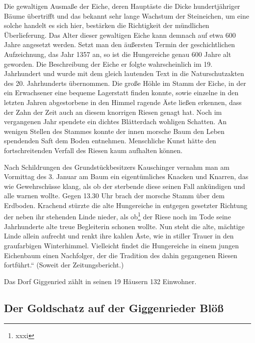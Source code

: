 \documentclass{book}
\begin{document}
Die gewaltigen Ausmaße der Eiche, deren Hauptäste die Dicke
hundertjähriger Bäume übertrifft und das bekannt sehr lange Wachstum der
Steineichen, um eine solche handelt es sich hier, bestärken die
Richtigkeit der mündlichen Überlieferung. Das Alter dieser gewaltigen
Eiche kann demnach auf etwa 600 Jahre angesetzt werden. Setzt man den
äußersten Termin der geschichtlichen Aufzeichnung, das Jahr 1357 an, so
ist die Hungereiche genau 600 Jahre alt geworden. Die Beschreibung der
Eiche er folgte wahrscheinlich im 19. Jahrhundert und wurde mit dem
gleich lautenden Text in die Naturschutzakten des 20. Jahrhunderts
übernommen. Die große Höhle im Stamm der Eiche, in der ein Erwachsener
eine bequeme Lagerstatt finden konnte, sowie einzelne in den letzten
Jahren abgestorbene in den Himmel ragende Äste ließen erkennen, dass der
Zahn der Zeit auch an diesem knorrigen Riesen genagt hat. Noch im
vergangenen Jahr spendete ein dichtes Blätterdach wohligen Schatten. An
wenigen Stellen des Stammes konnte der innen morsche Baum den Leben
spendenden Saft dem Boden entnehmen. Menschliche Kunst hätte den
fortschreitenden Verfall des Riesen kaum aufhalten können.

Nach Schildrungen des Grundstückbesitzers Kauschinger vernahm man am
Vormittag des 3. Januar am Baum ein eigentümliches Knacken und Knarren,
das wie Gewehrschüsse klang, als ob der sterbende diese seinen Fall
ankündigen und alle warnen wollte. Gegen 13.30 Uhr brach der morsche
Stamm über dem Erdboden. Krachend stürzte die alte Hungereiche in
entgegen gesetzter Richtung der neben ihr stehenden Linde nieder, als
ob\footnote{xxxi} der Riese noch im Tode seine Jahrhunderte alte treue
Begleiterin schonen wollte. Nun steht die alte, mächtige Linde allein
aufrecht und renkt ihre kahlen Äste, wie in stiller Trauer in den
graufarbigen Winterhimmel. Vielleicht findet die Hungereiche in einem
jungen Eichenbaum einen Nachfolger, der die Tradition des dahin
gegangenen Riesen fortführt.“ (Soweit der Zeitungsbericht.)

Das Dorf Giggenried zählt in seinen 19 Häusern 132 Einwohner.

\subsection{Der Goldschatz auf der Giggenrieder Blöß}
\end{document}
